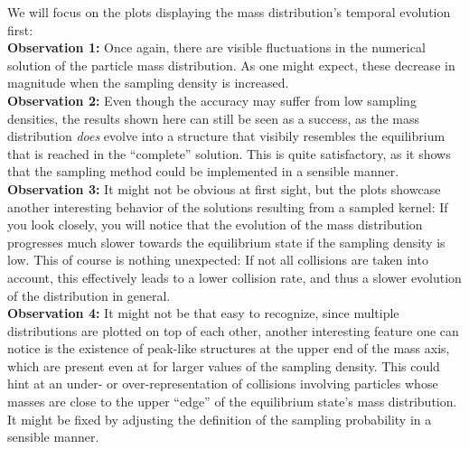         We will focus on the plots displaying the mass distribution's temporal 
        evolution first: \\

        \textbf{Observation 1:} Once again, there are visible fluctuations in the numerical 
        solution of the particle mass distribution. As one might expect, these decrease in 
        magnitude when the sampling density is increased. \\

        \textbf{Observation 2:} Even though the accuracy may suffer from low sampling densities,
        the results shown here can still be seen as a success, as the mass distribution
        \textit{does} evolve into a structure that visibily resembles the equilibrium that is
        reached in the ``complete'' solution. This is quite satisfactory, as it shows that the 
        sampling method could be implemented in a sensible manner. \\

        \textbf{Observation 3:} It might not be obvious at first sight, but the plots showcase
        another interesting behavior of the solutions resulting from a sampled kernel: 
        If you look closely, you will notice that the evolution of the mass distribution 
        progresses much slower towards the equilibrium state if the sampling density is low. 
        This of course is nothing unexpected: If not all collisions are taken into account,
        this effectively leads to a lower collision rate, and thus a slower evolution 
        of the distribution in general. \\


        \textbf{Observation 4:} 
        It might not be that easy to recognize, since multiple distributions are plotted on 
        top of each other, another interesting feature one can notice is the existence 
        of peak-like structures at the upper end of the mass axis, which are present even 
        at for larger values of the sampling density.
        This could hint at an under- or over-representation of collisions involving particles 
        whose masses are close to the upper ``edge'' of the equilibrium state's mass distribution.
        It might be fixed by adjusting the definition of the sampling probability in a 
        sensible manner.
        \\
        
